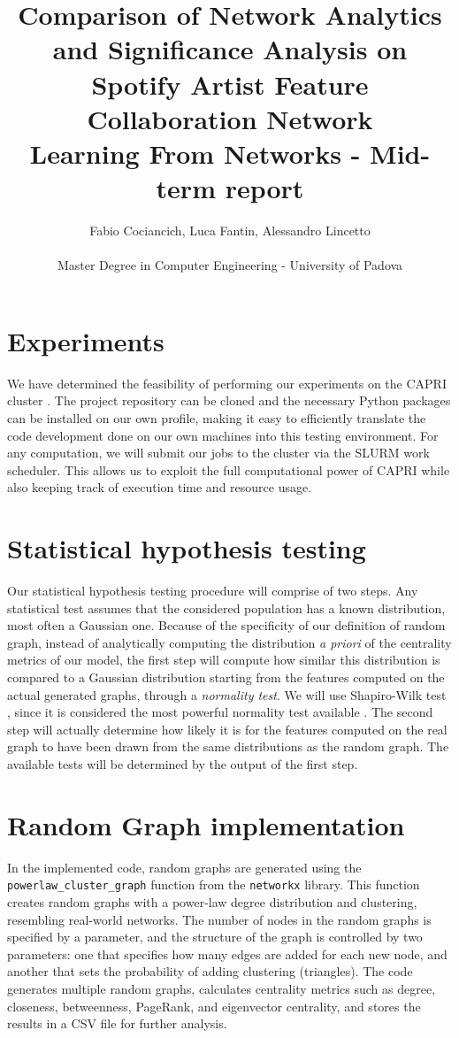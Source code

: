 \documentclass[a4paper, 12pt, conference]{ieeeconf}      %
\title{Comparison of Network Analytics and Significance Analysis on Spotify Artist Feature Collaboration Network\\
\large Learning From Networks - Mid-term report \\}
\author{Fabio Cociancich, Luca Fantin, Alessandro Lincetto %
\\\\ Master Degree in Computer Engineering - University of Padova \\
}
\begin{document}
\maketitle
\thispagestyle{plain}
\pagestyle{plain}



\section{Experiments}

We have determined the feasibility of performing our experiments on the CAPRI cluster \cite{capri}. The project repository can be cloned and the necessary Python packages can be installed on our own profile, making it easy to efficiently translate the code development done on our own machines into this testing environment. For any computation, we will submit our jobs to the cluster via the SLURM work scheduler. This allows us to exploit the full computational power of CAPRI while also keeping track of execution time and resource usage.

\section{Statistical hypothesis testing}

Our statistical hypothesis testing procedure will comprise of two steps. Any statistical test assumes that the considered population has a known distribution, most often a Gaussian one. Because of the specificity of our definition of random graph, instead of analytically computing the distribution \emph{a priori} of the centrality metrics of our model, the first step will compute how similar this distribution is compared to a Gaussian distribution starting from the features computed on the actual generated graphs, through a \emph{normality test}. We will use Shapiro-Wilk test \cite{ShapiroWilk1965}, since it is considered the most powerful normality test available \cite{RazaliYap2011}. The second step will actually determine how likely it is for the features computed on the real graph to have been drawn from the same distributions as the random graph. The available tests will be determined by the output of the first step.

\section{Random Graph implementation}
In the implemented code, random graphs are generated using the \texttt{powerlaw\_cluster\_graph} function from the \texttt{networkx} library. This function creates random graphs with a power-law degree distribution and clustering, resembling real-world networks. The number of nodes in the random graphs is specified by a parameter, and the structure of the graph is controlled by two parameters: one that specifies how many edges are added for each new node, and another that sets the probability of adding clustering (triangles). The code generates multiple random graphs, calculates centrality metrics such as degree, closeness, betweenness, PageRank, and eigenvector centrality, and stores the results in a CSV file for further analysis.
\end{document}
